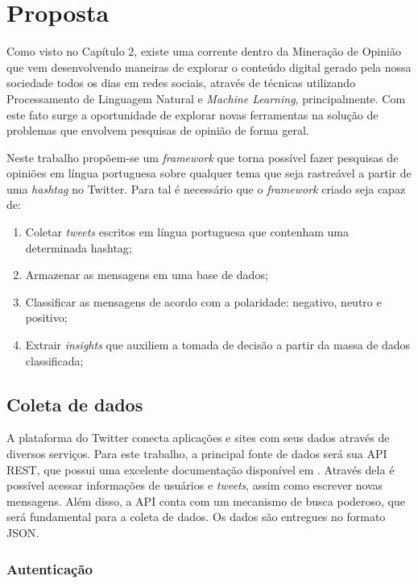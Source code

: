 \chapter{Proposta} \label{cap:proposta}

Como visto no Capítulo 2, existe uma corrente dentro da Mineração de Opinião que vem desenvolvendo maneiras de explorar o conteúdo digital gerado pela nossa sociedade todos os dias em redes sociais, através de técnicas utilizando Processamento de Linguagem Natural e \textit{Machine Learning}, principalmente. Com este fato surge a oportunidade de explorar novas ferramentas na
solução de problemas que envolvem pesquisas de opinião de forma geral.

Neste trabalho propõem-se um \textit{framework} que torna possível fazer pesquisas de opiniões em língua portuguesa sobre qualquer tema que seja rastreável a partir de uma \textit{hashtag} no Twitter.
Para tal é necessário que o \textit{framework} criado seja capaz de:

\begin{enumerate}
	\item Coletar \textit{tweets} escritos em língua portuguesa que contenham uma determinada {hashtag};
	\item Armazenar as mensagens em uma base de dados;
	\item Classificar as mensagens de acordo com a polaridade: negativo, neutro e positivo;
	\item Extrair \textit{insights} que auxiliem a tomada de decisão a partir da massa de dados classificada;
\end{enumerate}

\section{Coleta de dados}
A plataforma do Twitter conecta aplicações e sites com seus dados através de diversos serviços. Para este trabalho, a principal fonte de dados será sua API REST, que possui uma excelente documentação disponível em \cite{twitterapidocs}. Através dela é possível acessar informações de usuários e \textit{tweets}, assim como escrever novas mensagens. Além disso, a API conta com um mecanismo de busca poderoso, que será fundamental para a coleta de dados. Os dados são entregues no formato \ac{JSON}.

\subsection{Autenticação}

